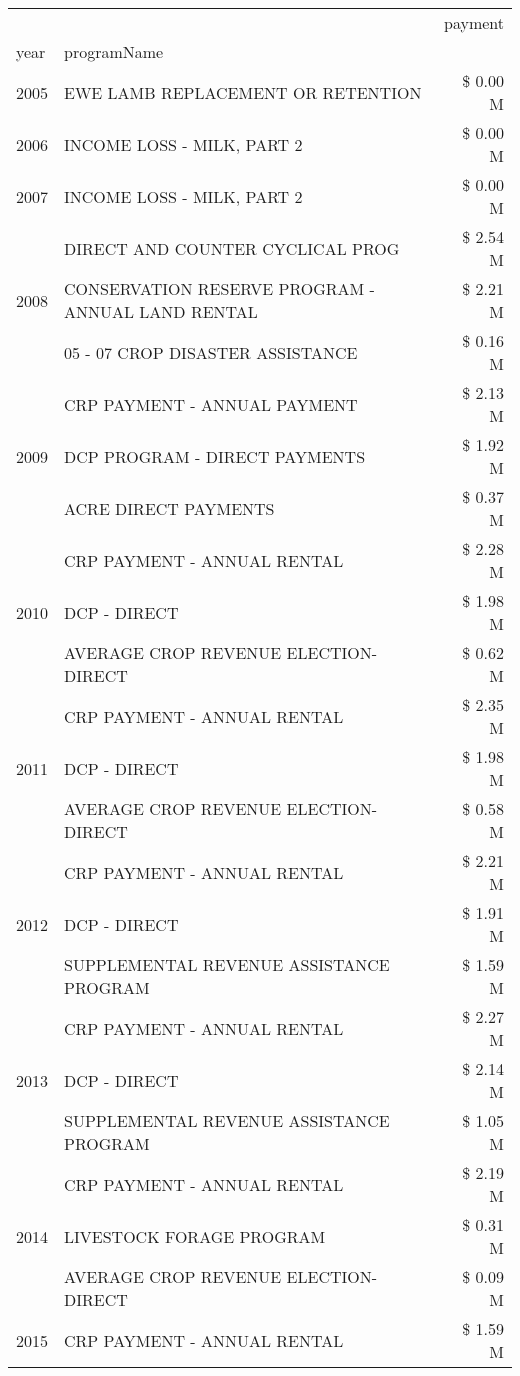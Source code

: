 \begin{tabular}{llr}
\toprule
 &  & payment \\
year & programName &  \\
\midrule
2005 & EWE LAMB REPLACEMENT OR RETENTION & \$ 0.00 M \\
\cline{1-3}
2006 & INCOME LOSS - MILK, PART 2 & \$ 0.00 M \\
\cline{1-3}
2007 & INCOME LOSS - MILK, PART 2 & \$ 0.00 M \\
\cline{1-3}
\multirow[t]{3}{*}{2008} & DIRECT AND COUNTER CYCLICAL PROG & \$ 2.54 M \\
 & CONSERVATION RESERVE PROGRAM - ANNUAL LAND RENTAL & \$ 2.21 M \\
 & 05 - 07 CROP DISASTER ASSISTANCE & \$ 0.16 M \\
\cline{1-3}
\multirow[t]{3}{*}{2009} & CRP PAYMENT - ANNUAL PAYMENT & \$ 2.13 M \\
 & DCP PROGRAM - DIRECT PAYMENTS & \$ 1.92 M \\
 & ACRE DIRECT PAYMENTS & \$ 0.37 M \\
\cline{1-3}
\multirow[t]{3}{*}{2010} & CRP PAYMENT - ANNUAL RENTAL & \$ 2.28 M \\
 & DCP - DIRECT & \$ 1.98 M \\
 & AVERAGE CROP REVENUE ELECTION-DIRECT & \$ 0.62 M \\
\cline{1-3}
\multirow[t]{3}{*}{2011} & CRP PAYMENT - ANNUAL RENTAL & \$ 2.35 M \\
 & DCP - DIRECT & \$ 1.98 M \\
 & AVERAGE CROP REVENUE ELECTION-DIRECT & \$ 0.58 M \\
\cline{1-3}
\multirow[t]{3}{*}{2012} & CRP PAYMENT - ANNUAL RENTAL & \$ 2.21 M \\
 & DCP - DIRECT & \$ 1.91 M \\
 & SUPPLEMENTAL REVENUE ASSISTANCE PROGRAM & \$ 1.59 M \\
\cline{1-3}
\multirow[t]{3}{*}{2013} & CRP PAYMENT - ANNUAL RENTAL & \$ 2.27 M \\
 & DCP - DIRECT & \$ 2.14 M \\
 & SUPPLEMENTAL REVENUE ASSISTANCE PROGRAM & \$ 1.05 M \\
\cline{1-3}
\multirow[t]{3}{*}{2014} & CRP PAYMENT - ANNUAL RENTAL & \$ 2.19 M \\
 & LIVESTOCK FORAGE PROGRAM & \$ 0.31 M \\
 & AVERAGE CROP REVENUE ELECTION-DIRECT & \$ 0.09 M \\
\cline{1-3}
\multirow[t]{3}{*}{2015} & CRP PAYMENT - ANNUAL RENTAL & \$ 1.59 M \\

\end{tabular}
